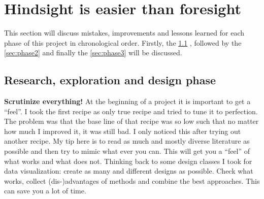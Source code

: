\section{Hindsight is easier than foresight}
This section will discuss mistakes, improvements and lessons learned for each phase of this project in chronological order. 
Firstly, the 
\ref{sec:phase1} \textit{}%
, followed by the 
\ref{sec:phase2} \textit{}%
 and finally the 
\ref{sec:phase3} \textit{}%
 will be discussed.
\subsection{Research, exploration and design phase}
\label{sec:phase1}
\textbf{Scrutinize everything!} At the beginning of a project it is important 
to get a ``feel''. I took the first recipe as only true recipe and tried to tune it to perfection. 
The problem was that the base line of that recipe was so low such that no matter how much I improved it, it was still bad. 
I only noticed this after trying out another recipe. 
My tip here is to read as much and mostly diverse literature as possible and then try to mimic what ever you can. 
This will get you a ``feel'' of what works and what does not. 
Thinking back to some design classes I took for data visualization: create as many and different designs as possible. 
Check what works, collect (dis-)advantages of methods and combine the best approaches. 
This can save you a lot of time. 

